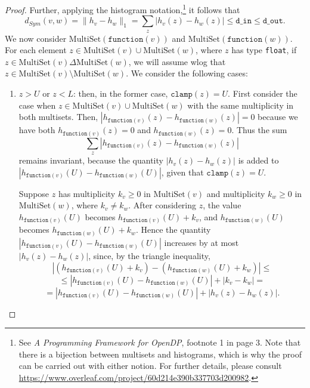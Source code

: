 \documentclass[11pt,a4paper]{article}
\theoremstyle{definition}
\newcommand{\MultiSet}{\mathrm{MultiSet}}
\newcommand{\din}{\texttt{d\_in}}
\newcommand{\dout}{\texttt{d\_out}}
\newcommand{\clamp}{\texttt{clamp}}
\newcommand{\function}{\texttt{function}}
\newcommand{\grace}[1]{{ {\color{purple}{(grace)~#1}}}}
\begin{document}
\begin{proof}
Further, applying the histogram notation,\footnote{See \textit{A Programming Framework for OpenDP}, footnote 1 in page 3. Note that there is a bijection between multisets and histograms, which is why the proof can be carried out with either notion. For further details, please consult \url{https://www.overleaf.com/project/60d214e390b337703d200982}.}  it follows that
\[
d_{Sym}(v, w) = \lVert h_{v} - h_{w}\rVert_1 = \sum_z |h_v(z) - h_w(z)| \leq \din \leq \dout.
\]
We now consider $\MultiSet(\function(v))$ and $\MultiSet(\function(w))$.
For each element $z \in \MultiSet(v) \cup \MultiSet(w)$, where $z$ has type \texttt{float}, if $z \in \MultiSet(v) \Delta \MultiSet(w)$, we will assume wlog that $z \in \MultiSet(v) \setminus \MultiSet(w)$. We consider the following cases:

\begin{enumerate}
    \item $z > U$ or $z < L$: then, in the former case, $\clamp(z) = U$. First consider the case when $z \in \MultiSet(v) \cup \MultiSet(w)$ with the same multiplicity in both multisets. Then, $|h_{\function(v)}(z) - h_{\function(w)}(z)| = 0$ because we have both $h_{\function(v)}(z) = 0$ and $h_{\function(w)}(z) = 0$. Thus the sum
    \[
    \sum_z |h_{\function(v)}(z) - h_{\function(w)}(z)|
    \]
    remains invariant, because the quantity $|h_{v}(z) - h_{w}(z)|$ is added to $|h_{\function(v)}(U) - h_{\function(w)}(U)|$, given that $\clamp(z) = U$. 
    
    
    Suppose $z$ has multiplicity $k_v \geq 0$ in $\MultiSet(v)$ and multiplicity $k_w \geq 0$ in $\MultiSet(w)$, where $k_v \neq k_w$. After considering $z$, the value $h_{\function(v)}(U)$ becomes $h_{\function(v)}(U) + k_v$, and $h_{\function(w)}(U)$ becomes $h_{\function(w)}(U) + k_w$. Hence the quantity $|h_{\function(v)}(U) - h_{\function(w)}(U)|$ increases by at most $|h_v(z) - h_w(z)|$, since, by the triangle inequality,
    \[
         |(h_{\function(v)}(U) + k_v) - (h_{\function(w)}(U) + k_w)| \leq
    \]
    \[
         \leq |h_{\function(v)}(U) - h_{\function(w)}(U)| + |k_v - k_w| =
    \]
    \[
        = |h_{\function(v)}(U) - h_{\function(w)}(U)| + |h_v(z) - h_w(z)|.
    \]
    

\end{enumerate}
\end{proof}
\end{document}
